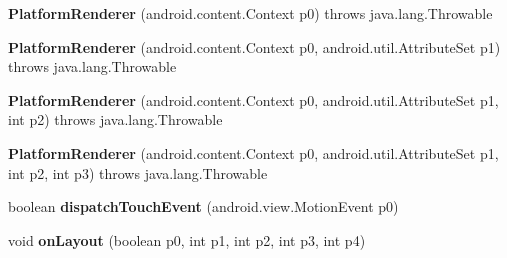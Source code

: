 \begin{DoxyCompactItemize}
\item 
\mbox{\label{classmd5b60ffeb829f638581ab2bb9b1a7f4f3f_1_1_platform_renderer_a90bfbb67da58b02ff0166542312af648}} 
{\bfseries Platform\+Renderer} (android.\+content.\+Context p0)  throws java.\+lang.\+Throwable 	
\item 
\mbox{\label{classmd5b60ffeb829f638581ab2bb9b1a7f4f3f_1_1_platform_renderer_a90fc0b6b4826200382896057d7702f7c}} 
{\bfseries Platform\+Renderer} (android.\+content.\+Context p0, android.\+util.\+Attribute\+Set p1)  throws java.\+lang.\+Throwable 	
\item 
\mbox{\label{classmd5b60ffeb829f638581ab2bb9b1a7f4f3f_1_1_platform_renderer_a8177f3eb1c1c90d64ec568241b38a443}} 
{\bfseries Platform\+Renderer} (android.\+content.\+Context p0, android.\+util.\+Attribute\+Set p1, int p2)  throws java.\+lang.\+Throwable 	
\item 
\mbox{\label{classmd5b60ffeb829f638581ab2bb9b1a7f4f3f_1_1_platform_renderer_ae1eb78b8d56f9c8431b1bb5a8cd0f3a6}} 
{\bfseries Platform\+Renderer} (android.\+content.\+Context p0, android.\+util.\+Attribute\+Set p1, int p2, int p3)  throws java.\+lang.\+Throwable 	
\item 
\mbox{\label{classmd5b60ffeb829f638581ab2bb9b1a7f4f3f_1_1_platform_renderer_a3e5da660e483bb06f7cefffd8f570ab8}} 
boolean {\bfseries dispatch\+Touch\+Event} (android.\+view.\+Motion\+Event p0)
\item 
\mbox{\label{classmd5b60ffeb829f638581ab2bb9b1a7f4f3f_1_1_platform_renderer_aa62ffd461aef9e033818b416eacdac3d}} 
void {\bfseries on\+Layout} (boolean p0, int p1, int p2, int p3, int p4)
\item 
\mbox{\label{classmd5b60ffeb829f638581ab2bb9b1a7f4f3f_1_1_platform_renderer_a08aa31496e02cae4a5b96c1668891094}} 

\end{DoxyCompactItemize}
